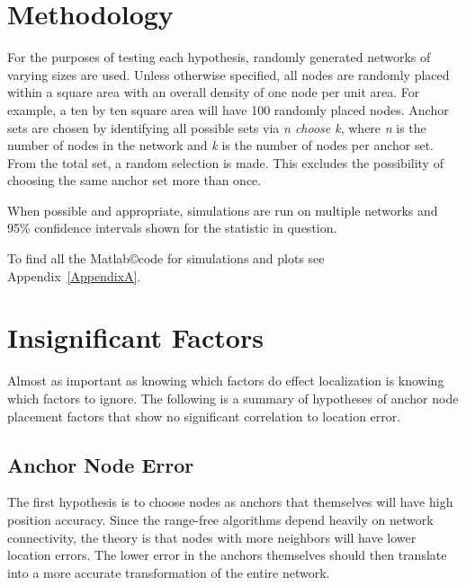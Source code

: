 \section{Methodology}
For the purposes of testing each hypothesis, randomly generated networks of varying sizes are used.  Unless otherwise specified, all nodes are randomly placed within a square area with an overall density of one node per unit area.  For example, a ten by ten square area will have 100 randomly placed nodes.  Anchor sets are chosen by identifying all possible sets via \emph{n choose k}, where \emph{n} is the number of nodes in the network and \emph{k} is the number of nodes per anchor set.  From the total set, a random selection is made.  This excludes the possibility of choosing the same anchor set more than once.

When possible and appropriate, simulations are run on multiple networks and 95\% confidence intervals shown for the statistic in question.  

To find all the Matlab\copyright code for simulations and plots see Appendix~\ref{AppendixA}.

\section{Insignificant Factors}
Almost as important as knowing which factors do effect localization is knowing which factors to ignore.
The following is a summary of hypotheses of anchor node placement factors that show no significant correlation to location error.  

\subsection{Anchor Node Error}
The first hypothesis is to choose nodes as anchors that themselves will have high position accuracy.  Since the range-free algorithms depend heavily on network connectivity, the theory is that nodes with more neighbors will have lower location errors.  The lower error in the anchors themselves should then translate into a more accurate transformation of the entire network.

\begin{figure}
  \centering
	\label{}
	\caption{}
\end{figure}

